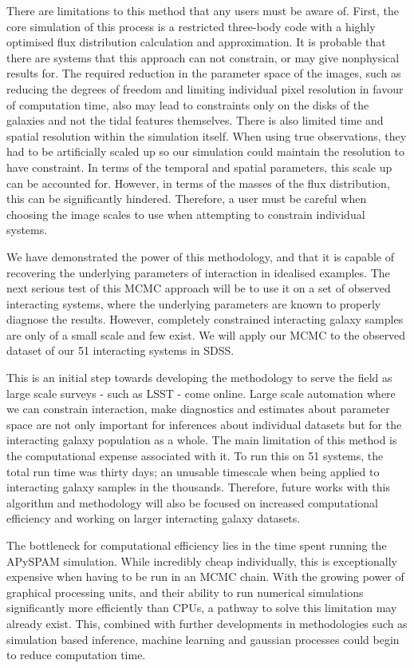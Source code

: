 There are limitations to this method that any users must be aware of. First, the core simulation of this process is a restricted three-body code with a highly optimised flux distribution calculation and approximation. It is probable that there are systems that this approach can not constrain, or may give nonphysical results for. The required reduction in the parameter space of the images, such as reducing the degrees of freedom and limiting individual pixel resolution in favour of computation time, also may lead to constraints only on the disks of the galaxies and not the tidal features themselves. There is also limited time and spatial resolution within the simulation itself. When using true observations, they had to be artificially scaled up so our simulation could maintain the resolution to have constraint. In terms of the temporal and spatial parameters, this scale up can be accounted for. However, in terms of the masses of the flux distribution, this can be significantly hindered. Therefore, a user must be careful when choosing the image scales to use when attempting to constrain individual systems. 

We have demonstrated the power of this methodology, and that it is capable of recovering the underlying parameters of interaction in idealised examples. The next serious test of this MCMC approach will be to use it on a set of observed interacting systems, where the underlying parameters are known to properly diagnose the results. However, completely constrained interacting galaxy samples are only of a small scale and few exist. We will apply our MCMC to the observed dataset of our 51 interacting systems in SDSS.

This is an initial step towards developing the methodology to serve the field as large scale surveys - such as LSST - come online. Large scale automation where we can constrain interaction, make diagnostics and estimates about parameter space are not only important for inferences about individual datasets but for the interacting galaxy population as a whole. The main limitation of this method is the computational expense associated with it. To run this on 51 systems, the total run time was thirty days; an unusable timescale when being applied to interacting galaxy samples in the thousands. Therefore, future works with this algorithm and methodology will also be focused on increased computational efficiency and working on larger interacting galaxy datasets. 

The bottleneck for computational efficiency lies in the time spent running the APySPAM simulation. While incredibly cheap individually, this is exceptionally expensive when having to be run in an MCMC chain. With the growing power of graphical processing units, and their ability to run numerical simulations significantly more efficiently than CPUs, a pathway to solve this limitation may already exist. This, combined with further developments in methodologies such as simulation based inference, machine learning and gaussian processes could begin to reduce computation time.